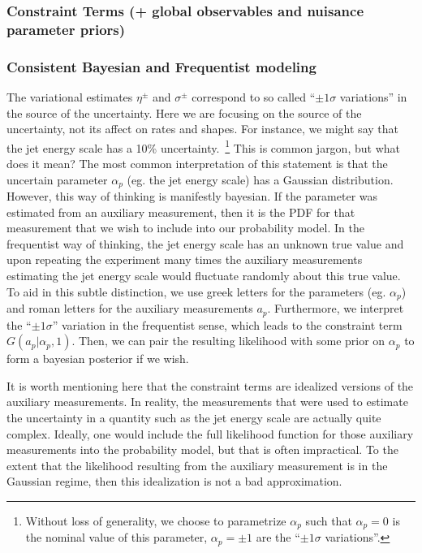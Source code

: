\newpage
\subsubsection{Constraint Terms (+ global observables and nuisance parameter priors)}\label{S:constraints}

\subsubsection{Consistent Bayesian and Frequentist modeling}

The variational estimates $\eta^\pm$ and $\sigma^\pm$ correspond to so called ``$\pm 1\sigma$ variations'' in the source of the uncertainty.  Here we are focusing on the source of the uncertainty, not its affect on rates and shapes.  For instance, we might say that the jet energy scale has a 10\% uncertainty.~\footnote{Without loss of generality, we choose to parametrize $\alpha_p$ such that $\alpha_p=0$ is the nominal value of this parameter, $\alpha_p=\pm 1$ are the ``$\pm 1\sigma$ variations''.}  This is common jargon, but what does it mean?  The most common interpretation of this statement is that the uncertain parameter $\alpha_p$ (eg. the jet energy scale) has a Gaussian distribution.  However, this way of thinking is manifestly bayesian.  If the parameter was estimated from an auxiliary measurement, then it is the PDF for that measurement that we wish to include into our probability model.  In the frequentist way of thinking, the jet energy scale has an unknown true value and upon repeating the experiment many times the auxiliary measurements estimating the jet energy scale would fluctuate randomly about this true value.  To aid in this subtle distinction, we use greek letters for the parameters (eg. $\alpha_p$) and roman letters for the auxiliary measurements $a_p$.  Furthermore, we interpret the ``$\pm 1\sigma$'' variation in the frequentist sense, which leads to the constraint term $G(a_p | \alpha_p,1)$.  Then, we can pair the resulting likelihood with some prior on $\alpha_p$ to form a bayesian posterior if we wish.


It is worth mentioning here that the constraint terms are idealized versions of the auxiliary measurements.  In reality, the measurements that were used to estimate the uncertainty in a quantity such as the jet energy scale are actually quite complex.  Ideally, one would include the full likelihood function for those auxiliary measurements into the probability model, but that is often impractical. To the extent that the likelihood resulting from the auxiliary measurement is in the Gaussian regime, then this idealization is not a bad approximation.  


